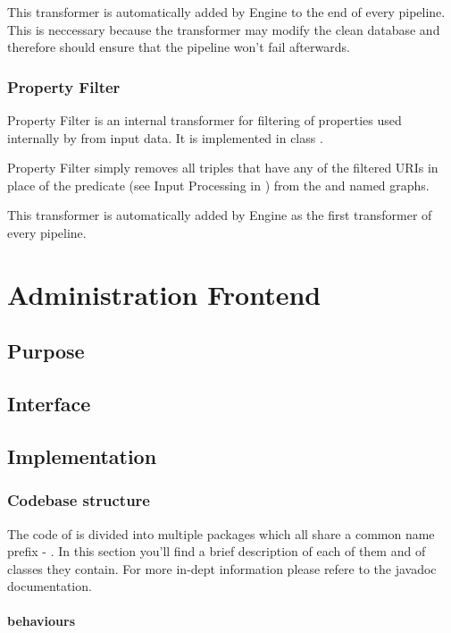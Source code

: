 This transformer is automatically added by Engine to the end of every pipeline. This is neccessary because the transformer may modify the clean database and therefore should ensure that the pipeline won't fail afterwards.

\subsection{Property Filter}
Property Filter is an internal transformer for filtering of properties used internally by \odcs from input data. It is implemented in class .

Property Filter simply removes all triples that have any of the filtered URIs in place of the predicate (see Input Processing in ) from the  and  named graphs.

This transformer is automatically added by Engine as the first transformer of every pipeline.

\chapter{Administration Frontend}
\section{Purpose}
\section{Interface}
\section{Implementation}

\subsection{Codebase structure}

The code of \FE is divided into multiple packages which all share a common name prefix - . In this section you'll find a brief description of each of them and of classes they contain. For more in-dept information please refere to the javadoc documentation.

\subsubsection{behaviours}

